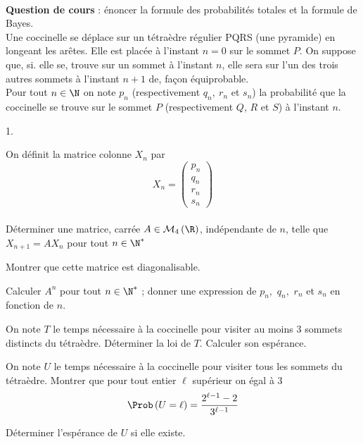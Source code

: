 \documentclass[11pt]{article}%
\begin{document}
\newpage


\begin{exerciceAP}~\\
  \textbf{Question de cours} : énoncer la formule des probabilités
  totales et la formule de Bayes.\\[.2cm]
  Une coccinelle se déplace sur un tétraèdre régulier PQRS (une
  pyramide) en longeant les arêtes. Elle est placée à l'instant $n=0$
  sur le sommet $P$. On suppose que, si. elle se, trouve sur un sommet
  à l'instant $n$, elle sera sur l'un des trois autres sommets à
  l'instant $n+1$ de, fa\c{c}on équiprobable.
  \\
  Pour tout $n\in \N$ on note $p_{n}$ (respectivement $q_{n},\ r_{n}$
  et $s_{n}$) la probabilité que la coccinelle se trouve sur le sommet
  $P$ (respectivement $Q$, $R$ et $S$) à l'instant $n$.

  \begin{noliste}{1.}
    \setlength{\itemsep}{2mm}
  \item On définit la matrice colonne $X_{n}$ par 
    \begin{equation*}
      X_{n}=\left( 
        \begin{array}{c}
          p_{n} \\ 
          q_{n} \\ 
          r_{n} \\ 
          s_{n}%
        \end{array}%
      \right) 
    \end{equation*}%
    \\
    Déterminer une matrice, carrée $A\in \mathcal{M}_{4}\left( \R%
    \right) $, indépendante de $n$, telle que $X_{n+1}=AX_{n}$ pour
    tout $n\in \N^{\ast }$

  \item Montrer que cette matrice est diagonalisable.

  \item Calculer $A^{n}$ pour tout $n\in \N^{\ast }$ ; donner une
    expression de $p_{n},$ $q_{n},$ $r_{n}$ et $s_{n}$ en fonction de $n$.

  \item On note $T$ le temps nécessaire à la coccinelle pour visiter
    au moins 3 sommets distincts du tétraèdre. Déterminer la loi de $%
    T$. Calculer son espérance.

  \item On note $U$ le temps nécessaire à la coccinelle pour visiter
    tous les sommets du tétraèdre. Montrer que pour tout entier $\ell $
    supérieur on égal à 3%
    \begin{equation*}
      \Prob\left( U=\ell \right) =\frac{2^{\ell -1}-2}{3^{\ell -1}}
    \end{equation*}

  \item Déterminer l'espérance de $U$ si elle existe.
  \end{noliste}  
\end{exerciceAP}
\end{document}
